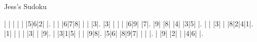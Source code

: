 Jess's Sudoku\vspace{0.2cm}

\begin{sudoku-block}| | | | | |5|6|2| |.
| | |6|7|8| | | |3|.
|3| | | | |6|9| |7|.
|9| |8| |4| |3|5| |.
| | |3| | |8|2|4|1|.
|1| | | | |3| | |9|.
| |3|1|5| | | |9|8|.
|5|6| |8|9|7| | | |.
| |9| |2| | |4|6| |.
\end{sudoku-block}